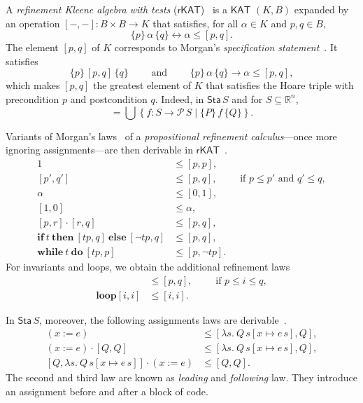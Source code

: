 \documentclass[envcountsame]{llncs}
\newcommand{\IF}[3]{\mathbf{if}\ #1\ \mathbf{then}\ #2\ \mathbf{else}\ #3}
\newcommand{\WHILE}[2]{\mathbf{while}\ #1\ \mathbf{do}\ #2}
\newcommand{\KAT}{\mathsf{KAT}}
\newcommand{\rKAT}{\mathsf{rKAT}}
\newcommand{\Pow}{\mathcal{P}}
\newcommand{\reals}{\mathbb{R}}
\newcommand{\sta}{\mathsf{Sta}}
\begin{document}
A \emph{refinement Kleene algebra with tests}
($\rKAT$)~\cite{ArmstrongGS16}  is a $\KAT$
$(K,B)$ expanded by an operation $[-,-]:B\times B\to K$ that
satisfies, for all $\alpha \in K$ and $p,q\in B$, 
\begin{equation*}
  \{p\}\, \alpha\, \{q\} \leftrightarrow \alpha\le [p,q].
\end{equation*}
The element $[p,q]$ of $K$ corresponds to Morgan's \emph{specification
  statement}~\cite{Morgan94}. It satisfies
\begin{equation*}
  \{p\}\, [p,q]\, \{q\}\qquad \text{ and }\qquad \{p\}\, \alpha\, \{q\} \rightarrow \alpha\le [p,q],
\end{equation*}
which makes $[p,q]$ the greatest element of $K$ that satisfies the Hoare
triple with precondition $p$ and postcondition $q$.  Indeed, in
$\sta\, S$ and for $S\subseteq \reals^n$,
\begin{equation*}
  [P,Q] = \bigcup \left\{f:S\to \Pow\, S \mid \{P\}\, f\, \{Q\}\right\}.
\end{equation*}

Variants of Morgan's laws~\cite{Morgan94} of a \emph{propositional
  refinement calculus}---once more ignoring assignments---are then derivable in
$\rKAT$~\cite{ArmstrongGS16}.
\begin{align}
  1 &\le [p,p],\label{eq:r-skip}\tag{r-skip}\\
[p',q'] &\le [p,q],\qquad \text{ if } p\le p'\text{ and } q'\le q,\label{eq:r-cons}\tag{r-cons}\\
\alpha & \le [0,1],\\
[1,0] &\le \alpha,\\
[p,r]\cdot [r,q] &\le [p,q],\label{eq:r-seq}\tag{r-seq}\\
\IF{t}{[tp,q]}{[\neg tp,q]} &\le [p,q],\label{eq:r-cond}\tag{r-cond}\\
 \WHILE{t}{[tp,p]} &\le [p,\neg tp]. \label{eq:r-while}\tag{r-while}
\end{align}
For invariants and loops, we obtain the additional refinement laws
\begin{align}
  [i,i] &\le [p,q],\qquad \text{ if } p\le i \le q,\label{eq:r-inv}\tag{r-inv}\\
\mathbf{loop} [i,i] &\le [i,i]. \label{eq:r-loop}\tag{r-loop}
\end{align}

In $\sta\, S$, moreover, the following assignments laws are
derivable~\cite{ArmstrongGS16}.
\begin{align}
 (x := e)  &\le  \left[\lambda s.\ Q\, s[x\mapsto e\, s],Q\right],\label{eq:r-assgn}\tag{r-assgn}\\
(x:= e) \cdot \left[Q,Q\right] &\le [\lambda s.\ Q\, s[x\mapsto e\, s],Q],\label{eq:r-assgn}\tag{r-assgnl}\\
\left[Q,\lambda s.\ Q\, s[x\mapsto e\, s]\right]\cdot (x:=e) &\le [Q,Q]. \label{eq:r-assgn}\tag{r-assgnf}
\end{align}
The second and third law are known as \emph{leading} and \emph{following}
law. They introduce an assignment before and after a block of code. 
\end{document}
